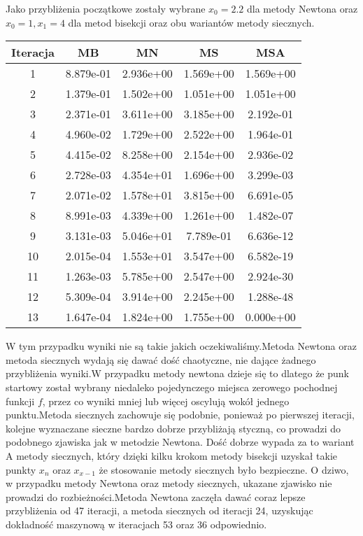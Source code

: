 \documentclass[11pt,wide]{article}
\begin{document}
Jako przybliżenia początkowe zostały wybrane $x_0 = 2.2$ dla metody Newtona oraz $x_0 = 1 , x_1 = 4$ dla metod bisekcji oraz obu wariantów metody siecznych.

\begin{center}
    \begin{tabular}{| c | c | c | c | c |}
    \hline
    Iteracja & MB & MN & MS & MSA \\ \hline \hline
	1 & 8.879e-01 & 2.936e+00 & 1.569e+00 & 1.569e+00 \\ \hline
	2 & 1.379e-01 & 1.502e+00 & 1.051e+00 & 1.051e+00 \\ \hline
	3 & 2.371e-01 & 3.611e+00 & 3.185e+00 & 2.192e-01 \\ \hline
	4 & 4.960e-02 & 1.729e+00 & 2.522e+00 & 1.964e-01 \\ \hline
	5 & 4.415e-02 & 8.258e+00 & 2.154e+00 & 2.936e-02 \\ \hline
	6 & 2.728e-03 & 4.354e+01 & 1.696e+00 & 3.299e-03 \\ \hline
	7 & 2.071e-02 & 1.578e+01 & 3.815e+00 & 6.691e-05 \\ \hline
	8 & 8.991e-03 & 4.339e+00 & 1.261e+00 & 1.482e-07 \\ \hline
	9 & 3.131e-03 & 5.046e+01 & 7.789e-01 & 6.636e-12 \\ \hline
	10 & 2.015e-04 & 1.553e+01 & 3.547e+00 & 6.582e-19 \\ \hline
	11 & 1.263e-03 & 5.785e+00 & 2.547e+00 & 2.924e-30 \\ \hline
	12 & 5.309e-04 & 3.914e+00 & 2.245e+00 & 1.288e-48 \\ \hline
	13 & 1.647e-04 & 1.824e+00 & 1.755e+00 & 0.000e+00 \\ \hline
    \end{tabular}
\end{center}
\noindent
\noindent
W tym przypadku wyniki nie są takie jakich oczekiwaliśmy.Metoda Newtona oraz metoda siecznych wydają się dawać dość chaotyczne, nie dające żadnego przybliżenia wyniki.W przypadku metody newtona dzieje się to dlatego że punk startowy został wybrany niedaleko pojedynczego miejsca zerowego pochodnej funkcji $f$, przez co wyniki mniej lub więcej oscylują wokół jednego punktu.Metoda siecznych zachowuje się podobnie, ponieważ po pierwszej iteracji, kolejne wyznaczane sieczne bardzo dobrze przybliżają styczną, co prowadzi do podobnego zjawiska jak w metodzie Newtona. Dość dobrze wypada za to wariant A metody siecznych, który dzięki kilku krokom metody bisekcji uzyskał takie punkty $x_n$ oraz $x_{x-1}$ że stosowanie metody siecznych było bezpieczne.\newline
O dziwo, w przypadku metody Newtona oraz metody siecznych, ukazane zjawisko nie prowadzi do rozbieżności.Metoda Newtona zaczęła dawać coraz lepsze przybliżenia od 47 iteracji, a metoda siecznych od iteracji 24, uzyskując dokładność maszynową w iteracjach 53 oraz 36 odpowiednio.
\end{document}
